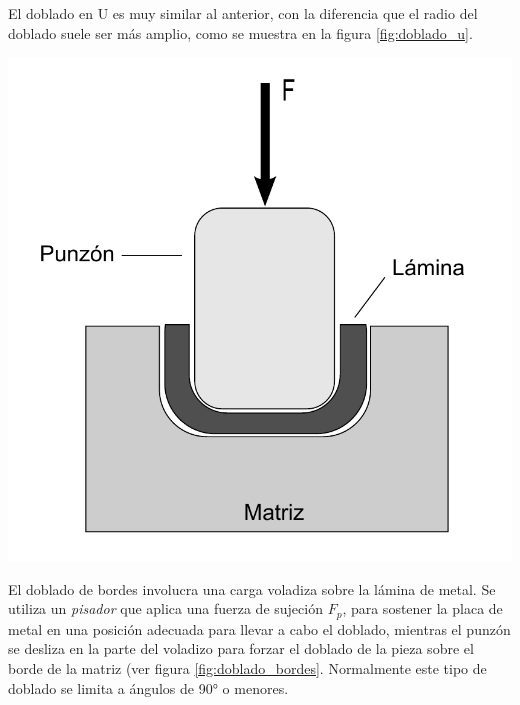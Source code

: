 El doblado en U es muy similar al anterior, con la diferencia que el radio del doblado 
suele ser más amplio, como se muestra en la figura \ref{fig:doblado_u}.

\begin{center}
\includegraphics[scale=0.4]{src/ch2/doblado_u}
\label{fig:doblado_u}
\end{center}

El doblado de bordes involucra una carga voladiza sobre la lámina de metal. Se utiliza 
un \textit{pisador} que aplica una fuerza de sujeción $F_p$, para sostener la placa de 
metal en una posición adecuada para llevar a cabo el doblado, mientras el punzón 
se desliza en la parte del voladizo para forzar el doblado de la pieza sobre el borde 
de la matriz (ver figura \ref{fig:doblado_bordes}. Normalmente este tipo de doblado 
se limita a ángulos de 90° o menores.

